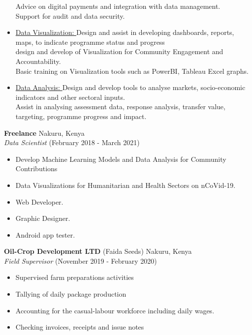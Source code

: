 \documentclass[line,margin,10pt]{res}
\begin{document}
\begin{resume}
\begin{itemize}
    Advice on digital payments and integration with data management.\\
    Support for audit and data security.\\
    \item \underline{Data Visualization: }
    Design and assist in developing dashboards, reports, maps, to indicate programme status and progress\\
    design and develop of Visualization for Community Engagement and Accountability.\\
    Basic training on Visualization tools such as PowerBI, Tableau Excel graphs.\\
    \item \underline{Data Analysis: }
    Design and develop tools to analyse markets, socio-economic indicators and other sectoral inputs.\\
    Assist in analysing assessment data, response analysis, transfer value, targeting, programme progress and impact.\\
\end{itemize}

\textbf{Freelance} \hfill Nakuru, Kenya\\
{\sl Data Scientist} \hfill (February 2018 - March 2021)
\begin{itemize} \itemsep -2pt
    \item Develop Machine Learning Models and Data Analysis for Community Contributions
    \item Data Visualizations for Humanitarian and Health Sectors on nCoVid-19.
    \item Web Developer.
    \item Graphic Designer.
    \item Android app tester.
\end{itemize}

\textbf{Oil-Crop Development LTD} (Faida Seeds) \hfill Nakuru, Kenya\\
{\sl Field Supervisor} \hfill (November 2019 - February 2020)
\begin{itemize} \itemsep -2pt
    \item Supervised farm preparations activities
    \item Tallying of daily package production
    \item Accounting for the casual-labour workforce including daily wages.
    \item Checking invoices, receipts and issue notes
\end{itemize}
{\vspace{-0.25cm}}


\end{resume}
\end{document}
